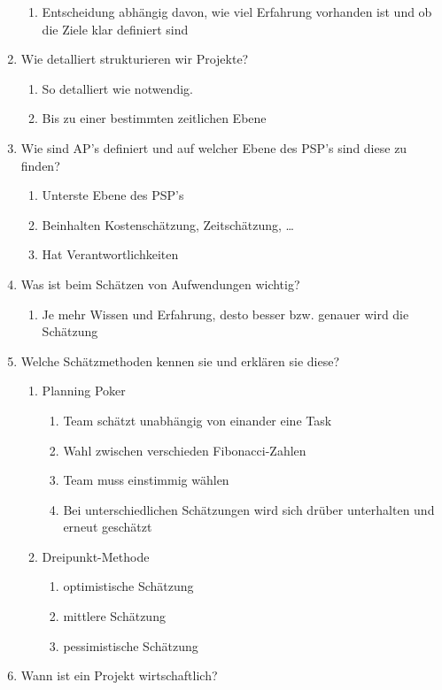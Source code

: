 \documentclass[12pt,a4paper]{article}
\begin{document}
\begin{enumerate}
\begin{enumerate}
		\item Entscheidung abhängig davon, wie viel Erfahrung vorhanden ist und ob die Ziele klar definiert sind
	\end{enumerate}
	\item Wie detalliert strukturieren wir Projekte?
	\begin{enumerate}
		\item So detalliert wie notwendig.
		\item Bis zu einer bestimmten zeitlichen Ebene
	\end{enumerate}
	\item Wie sind AP's definiert und auf welcher Ebene des PSP's sind diese zu finden?
	\begin{enumerate}
		\item Unterste Ebene des PSP's
		\item Beinhalten Kostenschätzung, Zeitschätzung, \dots
		\item Hat Verantwortlichkeiten
	\end{enumerate}
	\item Was ist beim Schätzen von Aufwendungen wichtig?
	\begin{enumerate}
		\item Je mehr Wissen und Erfahrung, desto besser bzw. genauer wird die Schätzung
	\end{enumerate}
	\item Welche Schätzmethoden kennen sie und erklären sie diese?
	\begin{enumerate}
		\item Planning Poker
		\begin{enumerate}
			\item Team schätzt unabhängig von einander eine Task
			\item Wahl zwischen verschieden Fibonacci-Zahlen
			\item Team muss einstimmig wählen
			\item Bei unterschiedlichen Schätzungen wird sich drüber unterhalten und erneut geschätzt
		\end{enumerate}
		\item Dreipunkt-Methode
		\begin{enumerate}
			\item optimistische Schätzung
			\item mittlere Schätzung
			\item pessimistische Schätzung
		\end{enumerate}
	\end{enumerate}
	\item Wann ist ein Projekt wirtschaftlich?

\end{enumerate}
\end{document}
